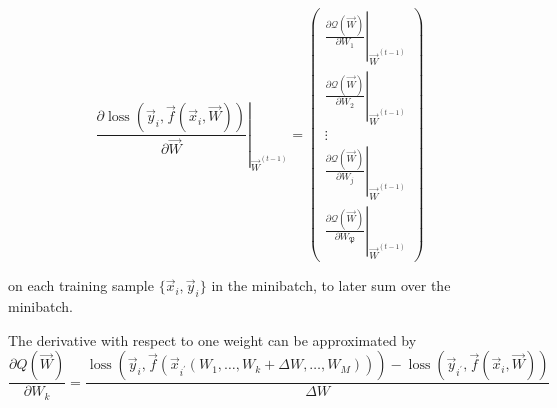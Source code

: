 \begin{equation}
    \left.\frac{\partial \operatorname{loss}\left(\vec{y}_i, \vec{f}\left(\vec{x}_i, \vec{W}\right)\right)}{\partial \vec{W}}\right|_{\vec{W}^{(t-1)}}=\left(\begin{array}{c}
    \left.\frac{\partial \mathcal{Q}(\vec{W})}{\partial W_1}\right|_{\vec{W}^{(t-1)}} \\
    \left.\frac{\partial \mathcal{Q}(\vec{W})}{\partial W_2}\right|_{\vec{W}^{(t-1)}} \\
    \vdots \\
    \left.\frac{\partial \mathcal{Q}(\vec{W})}{\partial W_j}\right|_{\vec{W}^{(t-1)}} \\
    \left.\frac{\partial \mathcal{Q}(\vec{W})}{\partial W_{\mathfrak{P}}}\right|_{\vec{W}^{(t-1)}}
    \end{array}\right)
\end{equation}

on each training sample $\{ \vec{x}_i,\vec{y}_i \}$ in the minibatch, to later sum over the minibatch.

The derivative with respect to one weight can be approximated by
\begin{equation}
    \frac{\partial Q(\vec{W})}{\partial W_k}=\frac{\operatorname{loss}\left(\vec{y}_i, \vec{f}\left(\vec{x}_{i^{\prime}}\left(W_1, \ldots, W_k+\Delta W, \ldots, W_M\right)\right)\right)-\operatorname{loss}\left(\vec{y}_{i^{\prime}}, \vec{f}\left(\vec{x}_i, \vec{W}\right)\right)}{\Delta W}
\end{equation}

